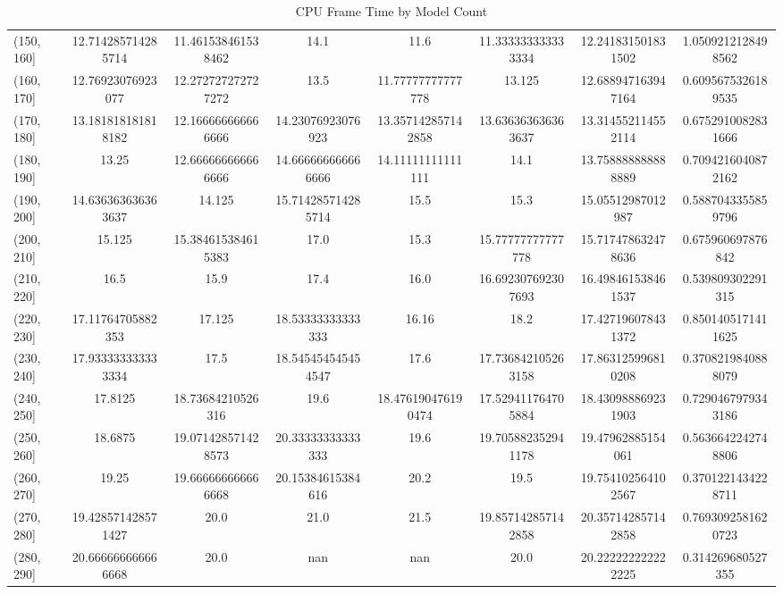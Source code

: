 \begin{table}[H]
\begin{tabular}{|l |c |c |c |c |c |c |c|}
(150, 160] & 12.714285714285714 & 11.461538461538462 & 14.1 & 11.6 & 11.333333333333334 & 12.241831501831502 & 1.0509212128498562 \\
(160, 170] & 12.76923076923077 & 12.272727272727272 & 13.5 & 11.77777777777778 & 13.125 & 12.688947163947164 & 0.6095675326189535 \\
(170, 180] & 13.181818181818182 & 12.166666666666666 & 14.23076923076923 & 13.357142857142858 & 13.636363636363637 & 13.314552114552114 & 0.6752910082831666 \\
(180, 190] & 13.25 & 12.666666666666666 & 14.666666666666666 & 14.11111111111111 & 14.1 & 13.758888888888889 & 0.7094216040872162 \\
(190, 200] & 14.636363636363637 & 14.125 & 15.714285714285714 & 15.5 & 15.3 & 15.05512987012987 & 0.5887043355859796 \\
(200, 210] & 15.125 & 15.384615384615383 & 17.0 & 15.3 & 15.77777777777778 & 15.717478632478636 & 0.675960697876842 \\
(210, 220] & 16.5 & 15.9 & 17.4 & 16.0 & 16.692307692307693 & 16.498461538461537 & 0.539809302291315 \\
(220, 230] & 17.11764705882353 & 17.125 & 18.53333333333333 & 16.16 & 18.2 & 17.427196078431372 & 0.8501405171411625 \\
(230, 240] & 17.933333333333334 & 17.5 & 18.545454545454547 & 17.6 & 17.736842105263158 & 17.863125996810208 & 0.3708219840888079 \\
(240, 250] & 17.8125 & 18.73684210526316 & 19.6 & 18.476190476190474 & 17.529411764705884 & 18.430988869231903 & 0.7290467979343186 \\
(250, 260] & 18.6875 & 19.071428571428573 & 20.33333333333333 & 19.6 & 19.705882352941178 & 19.47962885154061 & 0.5636642242748806 \\
(260, 270] & 19.25 & 19.666666666666668 & 20.15384615384616 & 20.2 & 19.5 & 19.754102564102567 & 0.3701221434228711 \\
(270, 280] & 19.428571428571427 & 20.0 & 21.0 & 21.5 & 19.857142857142858 & 20.357142857142858 & 0.7693092581620723 \\
(280, 290] & 20.666666666666668 & 20.0 & nan & nan & 20.0 & 20.222222222222225 & 0.314269680527355 \\
\hline
\end{tabular}
\caption{CPU Frame Time by Model Count}
\label{tab:cpu_frame_time}
\end{table}


